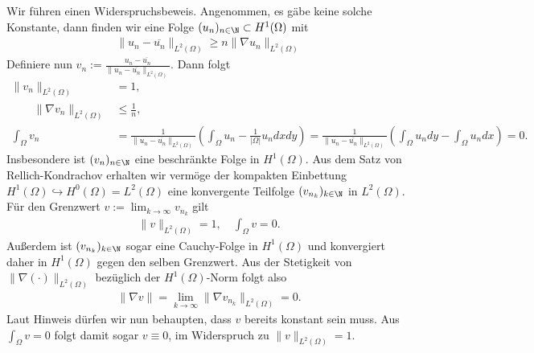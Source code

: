 \begin{solution}

Wir führen einen Widerspruchsbeweis. Angenommen, es gäbe keine solche Konstante,
dann finden wir eine Folge $(u_n)_{n \in \N} \subset H^1(\Omega)$ mit
\begin{align*}
  \|u_n - \overline{u_n}\|_{L^2(\Omega)} \geq n\|\nabla u_n\|_{L^2(\Omega)}
\end{align*}
Definiere nun $v_n := \frac{u_n - \overline{u_n}}{\|u_n - \overline{u_n}\|_{L^2(\Omega)}}$.
Dann folgt
\begin{align*}
  \|v_n\|_{L^2(\Omega)} &= 1, \\
  \qquad \|\nabla v_n\|_{L^2(\Omega)} &\leq \frac{1}{n}, \\
  \int_\Omega v_n &= \frac{1}{\|u_n -\overline{u_n}\|_{L^2(\Omega)}}
  \left(\int_{\Omega}u_n - \frac{1}{|\Omega|}u_n dx dy\right)
  = \frac{1}{\|u_n -\overline{u_n}\|_{L^2(\Omega)}}
  \left(\int_{\Omega}u_n dy - \int_\Omega u_n dx\right) = 0.
\end{align*}
Insbesondere ist $(v_n)_{n \in \N}$ eine beschränkte Folge in $H^1(\Omega)$.
Aus dem Satz von Rellich-Kondrachov erhalten wir vermöge der kompakten Einbettung
$H^1(\Omega) \hookrightarrow H^0(\Omega) = L^2(\Omega)$ eine konvergente Teilfolge
$(v_{n_k})_{k\in \N}$ in $L^2(\Omega)$. Für den Grenzwert $v := \lim_{k \to \infty} v_{n_k}$ gilt
\begin{align*}
  \|v\|_{L^2(\Omega)} = 1, \quad \int_\Omega v = 0.
\end{align*}
Außerdem ist $(v_{n_k})_{k \in \N}$ sogar eine Cauchy-Folge in $H^1(\Omega)$
und konvergiert daher in $H^1(\Omega)$ gegen den selben Grenzwert.
Aus der Stetigkeit von $\|\nabla(\cdot)\|_{L^2(\Omega)}$ bezüglich der $H^1(\Omega)$-Norm
folgt also
\begin{align*}
  \|\nabla v\| = \lim_{k \to \infty}\|\nabla v_{n_k}\|_{L^2(\Omega)} = 0.
\end{align*}
Laut Hinweis dürfen wir nun behaupten, dass $v$ bereits konstant sein muss.
Aus $\int_\Omega v = 0$ folgt damit sogar $v \equiv 0$, im Widerspruch zu $\|v\|_{L^2(\Omega)} = 1$.
\end{solution}

